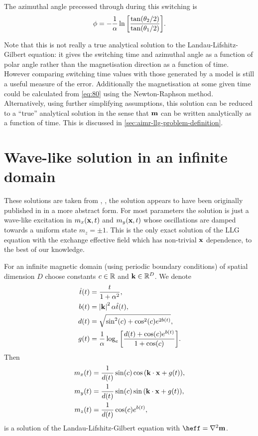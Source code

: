 The azimuthal angle precessed through during this switching is
\begin{equation}
  \phi = - \frac{1}{\alpha} \ln {\left[  \frac{\tan(\theta_2/2)}{\tan(\theta_1/2)}  \right]}.
\end{equation}

Note that this is not really a true analytical solution to the Landau-Lifshitz-Gilbert equation:
it gives the switching time and azimuthal angle as a function of polar angle rather than the magnetisation direction as a function of time.
However comparing switching time values with those generated by a model is still a useful measure of the error.
Additionally the magnetisation at some given time could be calculated from \cref{eq:80} using \eg the Newton-Raphson method.
Alternatively, using further simplifying assumptions, this solution can be reduced to a ``true'' analytical solution in the sense that $\boldsymbol{\mathrm{m}}$ can be written analytically as a function of time.
This is discussed in \cref{sec:aimr-llg-problem-definition}.


\section{Wave-like solution in an infinite domain}
\label{sec:wave-like-solution}

These solutions are taken from \cite{Jeong2014}, \cite{Fuwa2006}, the solution appears to have been originally published in \cite{Lakshmanan1976} in a more abstract form.
For most parameters the solution is just a wave-like excitation in $m_x(\boldsymbol{\mathrm{x}}, t)$ and $m_y(\boldsymbol{\mathrm{x}}, t)$ whose oscillations are damped towards a uniform state $m_z = \pm 1$.
This is the only exact solution of the LLG equation with the exchange effective field which has non-trivial $\boldsymbol{\mathrm{x}}$ dependence, to the best of our knowledge.

For an infinite magnetic domain (\ie using periodic boundary conditions) of spatial dimension $D$ choose constants  $c \in \mathbb{R}$ and $\boldsymbol{\mathrm{k}} \in \mathbb{R}^D$.
We denote
\begin{equation}
  \begin{aligned}
    \hat{t}(t) &= \frac{t}{1 + \alpha^2}, \\
    b(t) &= \left|{\boldsymbol{\mathrm{k}}} \right|^2 \alpha \hat{t}(t), \\
    d(t) &= \sqrt{\sin^2(c) + \cos^2(c)e^{2 b(t)}}, \\
    g(t) &= \frac{1}{\alpha} \log_e {\left[  \frac{d(t) + \cos(c) e^{b(t)}}{1 + \cos(c)}  \right]}.
  \end{aligned}
\end{equation}
Then
\begin{equation}
  \begin{aligned}
    m_x(t) &= \frac{1}{d(t)} \sin(c) \cos{\left( \boldsymbol{\mathrm{k}}\cdot \boldsymbol{\mathrm{x}}+ g(t)  \right)}, \\
    m_y(t) &= \frac{1}{d(t)} \sin(c) \sin{\left( \boldsymbol{\mathrm{k}}\cdot \boldsymbol{\mathrm{x}}+ g(t)  \right)}, \\
    m_z(t) &= \frac{1}{d(t)} \cos(c) e^{b(t)},
    \label{eq:97}
  \end{aligned}
\end{equation}
is a solution of the Landau-Lifshitz-Gilbert equation with $\heff = \lap \mv$.

